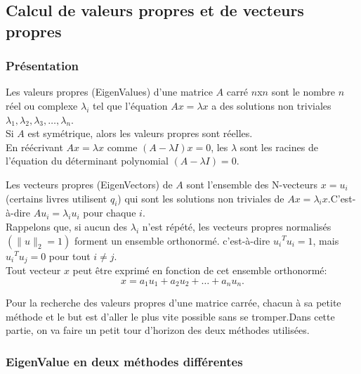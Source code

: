  \begin{itemize}
     \begin{itemize}
     \end{itemize}
     
 \end{itemize}



 \subsection{Calcul de valeurs propres et de vecteurs propres}
 
  \subsubsection{Présentation}


Les valeurs propres (EigenValues) d'une matrice $A$ carré $n$x$n$ sont le nombre $n$ réel ou complexe $\lambda_{i}$ tel que l'équation $Ax =\lambda x$ a des solutions non triviales ${\lambda}_{1},{\lambda}_{2},{\lambda}_{3},\ldots, {\lambda}_{n}$.\\
Si $A$ est symétrique, alors les valeurs propres sont réelles.\\
En réécrivant $Ax = \lambda x$ comme $(A - \lambda I) x = 0$, les $\lambda$ sont les racines de l'équation du déterminant polynomial $(A - \lambda I) = 0$.\par

Les vecteurs propres (EigenVectors) de $A$ sont l'ensemble des N-vecteurs $x = u_{i}$ (certains livres utilisent $q_{i}$) qui sont les solutions non triviales de $Ax = {\lambda}_{i}x$.C'est-à-dire $Au_{i} = {\lambda}_{i}u_{i}$ pour chaque $i$.\\
Rappelons que, si aucun des ${\lambda}_{i}$ n'est répété, les vecteurs propres normalisés $( \| u \|_{2} =1)$ forment un ensemble orthonormé. c'est-à-dire $ {u_{i}}^{T} u_{i}= 1$, mais $ {u_{i}}^{T} u_{j}= 0$ pour tout $i \neq j$.\\
Tout vecteur $x$ peut être exprimé en fonction de cet ensemble orthonormé:
$$x=a_{1}u_{1}+a_{2}u_{2}+ \ldots + a_{n}u_{n}.$$

Pour la recherche des valeurs propres d'une matrice carrée, chacun à sa petite méthode et le but est d'aller le plus vite possible sans se tromper.Dans cette partie, on va faire un petit tour d'horizon des deux méthodes utilisées.

\subsubsection{EigenValue en deux méthodes différentes}

